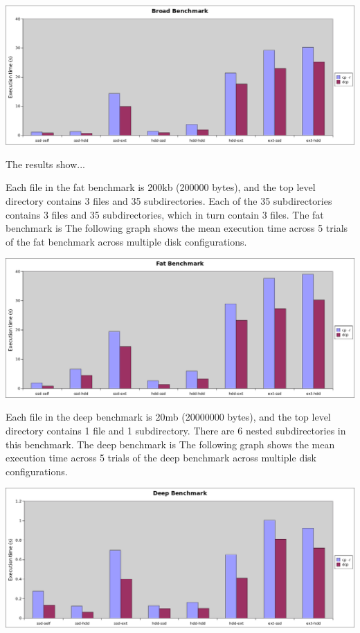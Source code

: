 \documentclass[12pt]{article}
\begin{document}
\includegraphics[width=500pt]{graphs/broad-manydisk.png}

\vspace{5mm}

The results show... %

Each file in the fat benchmark is 200kb (200000 bytes), and
the top level directory contains 3 files and 35 subdirectories. Each
of the 35 subdirectories contains 3 files and 35 subdirectories, which in turn contain 3 files.
The fat benchmark is %
The following graph shows the mean execution time across 5 trials of the fat benchmark across multiple disk configurations.
\vspace{5mm}

\includegraphics[width=500pt]{graphs/fat-manydisk.png}

\vspace{5mm}

Each file in the deep benchmark is 20mb (20000000 bytes), and
the top level directory contains 1 file and 1 subdirectory. There
are 6 nested subdirectories in this benchmark.
The deep benchmark is %
The following graph shows the mean execution time across 5 trials of the deep benchmark across multiple disk configurations.

\vspace{5mm}

\includegraphics[width=500pt]{graphs/deep-manydisk.png}
\end{document}
